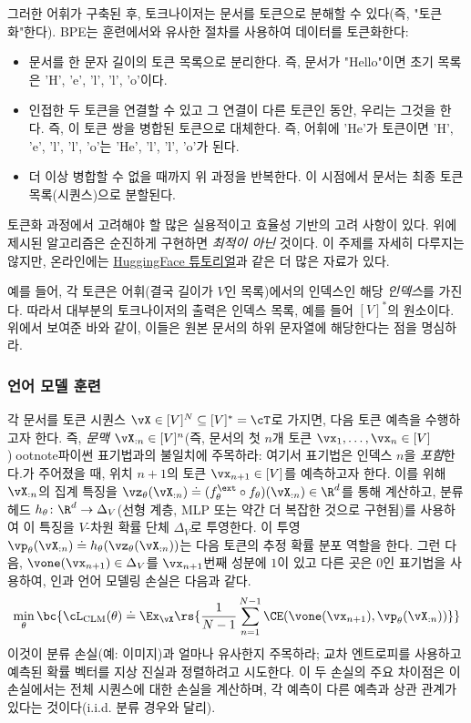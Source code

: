 \documentclass[../../book-main_ko.tex]{subfiles}
\begin{document}
그러한 어휘가 구축된 후, 토크나이저는 문서를 토큰으로 분해할 수 있다(즉, "토큰화"한다). BPE는 훈련에서와 유사한 절차를 사용하여 데이터를 토큰화한다:
\begin{itemize}
    \item 문서를 한 문자 길이의 토큰 목록으로 분리한다. 즉, 문서가 "Hello"이면 초기 목록은 'H', 'e', 'l', 'l', 'o'이다.
    \item 인접한 두 토큰을 연결할 수 있고 그 연결이 다른 토큰인 동안, 우리는 그것을 한다. 즉, 이 토큰 쌍을 병합된 토큰으로 대체한다. 즉, 어휘에 'He'가 토큰이면 'H', 'e', 'l', 'l', 'o'는 'He', 'l', 'l', 'o'가 된다.
    \item 더 이상 병합할 수 없을 때까지 위 과정을 반복한다. 이 시점에서 문서는 최종 토큰 목록(시퀀스)으로 분할된다.
\end{itemize}

토큰화 과정에서 고려해야 할 많은 실용적이고 효율성 기반의 고려 사항이 있다. 위에 제시된 알고리즘은 순진하게 구현하면 \textit{최적이 아닌} 것이다. 이 주제를 자세히 다루지는 않지만, 온라인에는 \href{https://huggingface.co/learn/nlp-course/en/chapter6/5}{HuggingFace 튜토리얼}과 같은 더 많은 자료가 있다.

예를 들어, 각 토큰은 어휘(결국 길이가 \(V\)인 목록)에서의 인덱스인 해당 \textit{인덱스}를 가진다. 따라서 대부분의 토크나이저의 출력은 인덱스 목록, 예를 들어 \([V]^{*}\)의 원소이다. 위에서 보여준 바와 같이, 이들은 원본 문서의 하위 문자열에 해당한다는 점을 명심하라.

\subsubsection{언어 모델 훈련}

각 문서를 토큰 시퀀스 \(\vX \in [V]^{N} \subseteq [V]^{*} = \cT\)로 가지면, 다음 토큰 예측을 수행하고자 한다. 즉, \textit{문맥} \(\vX_{:n} \in [V]^{n}\)(즉, 문서의 첫 \(n\)개 토큰 \(\vx_{1}, \dots, \vx_{n} \in [V]\))ootnote{파이썬 표기법과의 불일치에 주목하라: 여기서 표기법은 인덱스 \(n\)을 \textit{포함}한다.}가 주어졌을 때, 위치 \(n + 1\)의 토큰 \(\vx_{n + 1} \in [V]\)를 예측하고자 한다. 이를 위해 \(\vX_{:n}\)의 집계 특징을 \(\vz_{\theta}(\vX_{:n}) \doteq (f_{\theta}^{\ext} \circ f_{\theta})(\vX_{:n}) \in \R^{d}\)를 통해 계산하고, 분류 헤드 \(h_{\theta} \colon \R^{d} \to \Delta_{V}\)(선형 계층, MLP 또는 약간 더 복잡한 것으로 구현됨)를 사용하여 이 특징을 \(V\)-차원 확률 단체 \(\Delta_{V}\)로 투영한다. 이 투영 \(\vp_{\theta}(\vX_{:n}) \doteq h_{\theta}(\vz_{\theta}(\vX_{:n}))\)는 다음 토큰의 추정 확률 분포 역할을 한다. 그런 다음, \(\vone(\vx_{n + 1}) \in \Delta_{V}\)를 \(\vx_{n + 1}\)번째 성분에 \(1\)이 있고 다른 곳은 \(0\)인 표기법을 사용하여, 인과 언어 모델링 손실은 다음과 같다.
\begin{equation}\label{eq:clm_loss}
    \min_{\theta}\bc{\cL_{\mathrm{CLM}}(\theta) \doteq \Ex_{\vX}\rs{\frac{1}{N - 1}\sum_{n = 1}^{N - 1}\CE(\vone(\vx_{n + 1}), \vp_{\theta}(\vX_{:n}))}}
\end{equation}
이것이 분류 손실(예: 이미지)과 얼마나 유사한지 주목하라; 교차 엔트로피를 사용하고 예측된 확률 벡터를 지상 진실과 정렬하려고 시도한다. 이 두 손실의 주요 차이점은 이 손실에서는 전체 시퀀스에 대한 손실을 계산하며, 각 예측이 다른 예측과 상관 관계가 있다는 것이다(i.i.d. 분류 경우와 달리).
\end{document}
